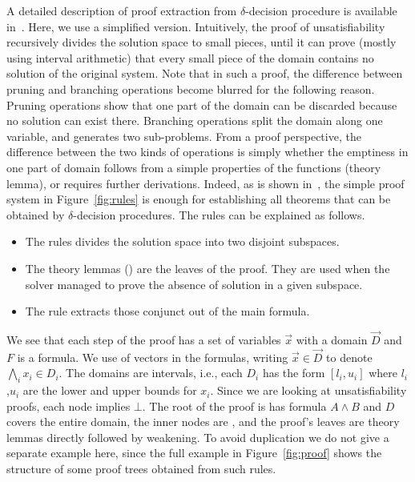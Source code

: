 A detailed description of proof extraction from $\delta$-decision procedure is available in~\cite{DBLP:conf/synasc/GaoKC14}.
Here, we use a simplified version. Intuitively, the proof of unsatisfiability recursively divides the solution space to small pieces, until it can prove (mostly using interval arithmetic) that every small piece of the domain contains no solution of the original system. Note that in such a proof, the difference between pruning and branching operations become blurred for the following reason. Pruning operations show that one part of the domain can be discarded because no solution can exist there. Branching operations split the domain along one variable, and generates two sub-problems. From a proof perspective, the difference between the two kinds of operations is simply whether the emptiness in one part of domain follows from a simple properties of the functions (theory lemma), or requires further derivations. Indeed, as is shown in~\cite{DBLP:conf/synasc/GaoKC14}, the simple proof system in Figure~\ref{fig:rules} is enough for establishing all theorems that can be obtained by $\delta$-decision procedures. The rules can be explained as follows. 
\begin{itemize}
\item The \splt rules divides the solution space into two disjoint subspaces.
\item The theory lemmas (\thLem) are the leaves of the proof. They are used when the solver managed to prove the absence of solution in a given subspace.
\item The \weaken rule extracts those conjunct out of the main formula.
\end{itemize}
We see that each step of the proof has a set of variables $\vec x$ with a domain $\vec D$ and $F$ is a formula. We use of vectors in the formulas, writing $\vec x ∈ \vec D$ to denote $\bigwedge_i x_i ∈ D_i$. The domains are intervals, i.e., each $D_i$ has the form $[l_i,u_i]$ where $l_i$,$u_i$ are the lower and upper bounds for $x_i$. Since we are looking at unsatisfiability proofs, each node implies $⊥$. The root of the proof is has formula $A ∧ B$ and $D$ covers the entire domain, the inner nodes are \splt, and the proof's leaves are theory lemmas directly followed by weakening. To avoid duplication we do not give a separate example here, since the full example in Figure~\ref{fig:proof} shows the structure of some proof trees obtained from such rules. 


